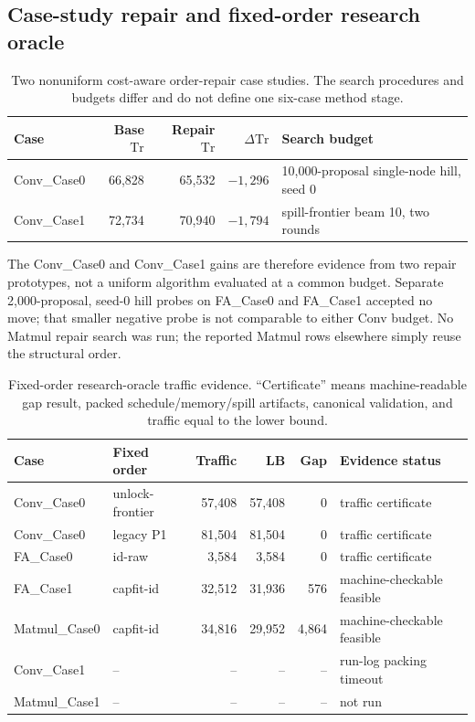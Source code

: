 \subsection{Case-study repair and fixed-order research oracle}
\label{sec:supp-exact}

\begin{table}[htbp]
\centering
\caption{Two nonuniform cost-aware order-repair case studies.  The search
procedures and budgets differ and do not define one six-case method stage.}
\label{tab:supp-repair}
\begin{tabular}{lrrrl}
\toprule
Case & Base $\mathrm{Tr}$ & Repair $\mathrm{Tr}$ & $\Delta\mathrm{Tr}$ & Search budget\\
\midrule
Conv\_Case0 & 66,828 & 65,532 & $-1,296$ & 10,000-proposal single-node hill, seed 0\\
Conv\_Case1 & 72,734 & 70,940 & $-1,794$ & spill-frontier beam 10, two rounds\\
\bottomrule
\end{tabular}
\end{table}

The Conv\_Case0 and Conv\_Case1 gains are therefore evidence from two repair
prototypes, not a uniform algorithm evaluated at a common budget.  Separate
2,000-proposal, seed-0 hill probes on FA\_Case0 and FA\_Case1 accepted no move;
that smaller negative probe is not comparable to either Conv budget.  No
Matmul repair search was run; the reported Matmul rows elsewhere simply reuse
the structural order.

\begin{table}[htbp]
\centering
\caption{Fixed-order research-oracle traffic evidence.  ``Certificate'' means
machine-readable gap result, packed schedule/memory/spill artifacts, canonical
validation, and traffic equal to the lower bound.}
\label{tab:supp-exact}
\begin{tabular}{llrrrl}
\toprule
Case & Fixed order & Traffic & LB & Gap & Evidence status\\
\midrule
Conv\_Case0 & unlock-frontier & 57,408 & 57,408 & 0 & traffic certificate\\
Conv\_Case0 & legacy P1 & 81,504 & 81,504 & 0 & traffic certificate\\
FA\_Case0 & id-raw & 3,584 & 3,584 & 0 & traffic certificate\\
FA\_Case1 & capfit-id & 32,512 & 31,936 & 576 & machine-checkable feasible\\
Matmul\_Case0 & capfit-id & 34,816 & 29,952 & 4,864 & machine-checkable feasible\\
Conv\_Case1 & -- & -- & -- & -- & run-log packing timeout\\
Matmul\_Case1 & -- & -- & -- & -- & not run\\
\bottomrule
\end{tabular}
\end{table}

